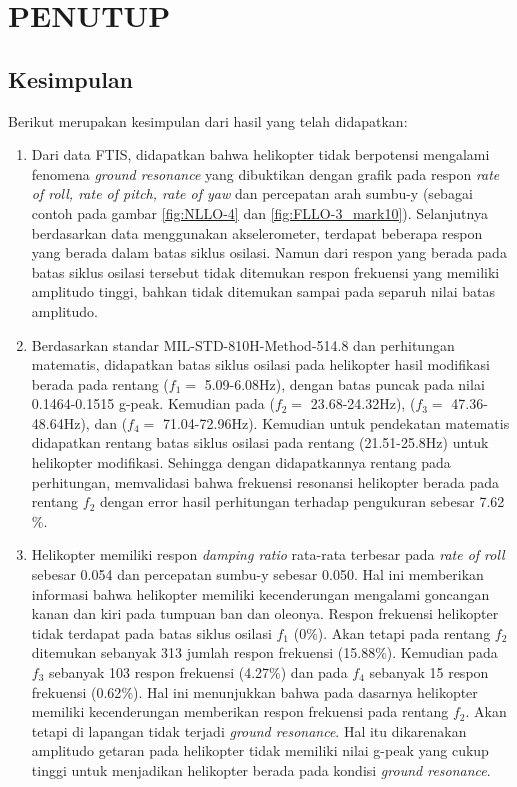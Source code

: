 \chapter{PENUTUP}
\label{chap:penutup}


\section{Kesimpulan}
\label{sec:kesimpulan}

Berikut merupakan kesimpulan dari hasil yang telah didapatkan:

\begin{enumerate}[nolistsep]

	\item Dari data FTIS, didapatkan bahwa helikopter tidak berpotensi mengalami fenomena \textit{ground resonance} yang dibuktikan dengan grafik pada respon \textit{rate of roll, rate of pitch, rate of yaw} dan percepatan arah sumbu-y (sebagai contoh pada gambar \ref{fig:NLLO-4} dan \ref{fig:FLLO-3_mark10}). Selanjutnya berdasarkan data menggunakan akselerometer, terdapat beberapa respon yang berada dalam batas siklus osilasi. Namun dari respon yang berada pada batas siklus osilasi tersebut tidak ditemukan respon frekuensi yang memiliki amplitudo tinggi, bahkan tidak ditemukan sampai pada separuh nilai batas amplitudo. 

	\item Berdasarkan standar MIL-STD-810H-Method-514.8 dan perhitungan matematis, didapatkan batas siklus osilasi pada helikopter hasil modifikasi berada pada rentang ($f_1=$ 5.09-6.08Hz), dengan batas puncak pada nilai 0.1464-0.1515 g-peak. Kemudian pada ($f_2=$ 23.68-24.32Hz), ($f_3=$ 47.36-48.64Hz), dan ($f_4=$ 71.04-72.96Hz). Kemudian untuk pendekatan matematis didapatkan rentang batas siklus osilasi pada rentang (21.51-25.8Hz) untuk helikopter modifikasi. Sehingga dengan didapatkannya rentang pada perhitungan, memvalidasi bahwa frekuensi resonansi helikopter berada pada rentang $f_2$ dengan error hasil perhitungan terhadap pengukuran sebesar 7.62$\%$.
     
	\item Helikopter memiliki respon \textit{damping ratio} rata-rata terbesar pada \textit{rate of roll} sebesar 0.054 dan percepatan sumbu-y sebesar 0.050. Hal ini memberikan informasi bahwa helikopter memiliki kecenderungan mengalami goncangan kanan dan kiri pada tumpuan ban dan oleonya. Respon frekuensi helikopter tidak terdapat pada batas siklus osilasi $f_1$ (0$\%$). Akan tetapi pada rentang $f_2$ ditemukan sebanyak 313 jumlah respon frekuensi (15.88$\%$). Kemudian pada $f_3$ sebanyak 103 respon frekuensi (4.27$\%$) dan pada $f_4$ sebanyak 15 respon frekuensi (0.62$\%$). Hal ini menunjukkan bahwa pada dasarnya helikopter memiliki kecenderungan memberikan respon frekuensi pada rentang $f_2$. Akan tetapi di lapangan tidak terjadi \textit{ground resonance}. Hal itu dikarenakan amplitudo getaran pada helikopter tidak memiliki nilai g-peak yang cukup tinggi untuk menjadikan helikopter berada pada kondisi \textit{ground resonance}.
 

\end{enumerate}
